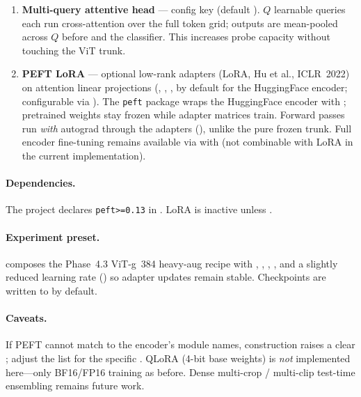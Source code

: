 \begin{enumerate}[leftmargin=2em]
\item \textbf{Multi-query attentive head} ---
      config key  (default ).
      \(Q\) learnable queries each run cross-attention over the full
      token grid; outputs are mean-pooled across \(Q\) before
       and the classifier. This increases probe capacity
      without touching the ViT trunk.
\item \textbf{PEFT LoRA} --- optional low-rank adapters (LoRA, Hu et al.,
      ICLR~2022) on attention linear projections
      (, , ,  by default for
      the HuggingFace  encoder; configurable via
      ).
      The \texttt{peft} package wraps the HuggingFace encoder with
      ; pretrained weights stay frozen while
      adapter matrices train. Forward passes run \emph{with} autograd
      through the adapters (), unlike
      the pure frozen trunk. Full encoder fine-tuning remains available
      via  with 
      (not combinable with LoRA in the current implementation).
\end{enumerate}

\paragraph{Dependencies.}
The project declares \texttt{peft>=0.13} in .
LoRA is inactive unless .

\paragraph{Experiment preset.}
 composes the Phase~4.3
ViT-g~384 heavy-aug recipe with ,
, , ,
and a slightly reduced learning rate () so
adapter updates remain stable. Checkpoints are written to
 by default.

\paragraph{Caveats.}
If PEFT cannot match  to the encoder's
module names, construction raises a clear ; adjust
the list for the specific . QLoRA (4-bit base weights) is
\emph{not} implemented here---only BF16/FP16 training as before. Dense
multi-crop / multi-clip test-time ensembling remains future work.
